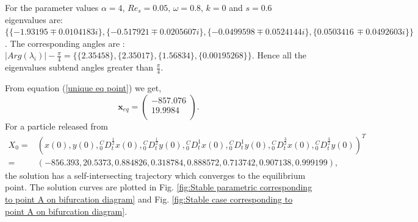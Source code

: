 \documentclass[pdflatex,sn-mathphys]{sn-jnl}%
\theoremstyle{thmstyleone}%
\theoremstyle{thmstyletwo}%
\theoremstyle{thmstylethree}%
\begin{document}
For the parameter values $\alpha = 4$, $Re_{s}=0.05$, $\omega=0.8$, $k=0$ and $s=0.6$ eigenvalues are: $ \{\{-1.93195 \mp 0.0104183 i\},\{-0.517921 \mp 0.0205607 i\},\{-0.0499598\mp 0.0524144 i\},\{0.0503416\, \mp 0.0492603 i\}\}$.
The corresponding angles are : \\$\vert Arg(\lambda_{i})\vert - \frac{\pi}{4}= \{\{2.35458\},\{2.35017\},\{1.56834\},\{0.00195268\}\}$. Hence all the eigenvalues subtend angles greater than $\frac{\pi}{4}$.

From equation (\ref{unique eq point}) we get,
$$\mathbf{x}_{eq}=
\left(
\begin{array}{c}
 -857.076 \\
 19.9984 \\
\end{array}
\right).$$
For a particle released from
\begin{align*}
X_{0}=&
\left(
x(0) ,
y(0) ,
{ }_{0}^{C}D_{t}^{\frac{1}{2}}x(0) ,
{ }_{0}^{C}D_{t}^{\frac{1}{2}}y(0) ,
{ }_{0}^{C}D_{t}^{1} x(0) ,
{ }_{0}^{C}D_{t}^{1}y(0) ,
{ }_{0}^{C}D_{t}^{\frac{3}{2}}x(0) ,
{ }_{0}^{C}D_{t}^{\frac{3}{2}}y(0)
\right)^T \\ =& \left(
 -856.393,
 20.5373,
 0.884826,
 0.318784,
 0.888572,
 0.713742,
 0.907138,
 0.999199 
\right),
\end{align*}
the solution has a self-intersecting trajectory which converges to the equilibrium point. The solution curves are plotted in Fig. \ref{fig:Stable parametric corresponding to point A on bifurcation diagram} and Fig. \ref{fig:Stable case corresponding to point A on bifurcation diagram}.
\end{document}

